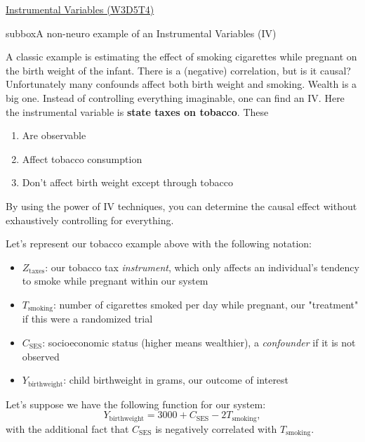 \begin{textbox}{\href{https://compneuro.neuromatch.io/tutorials/W3D5_NetworkCausality/student/W3D5_Tutorial4.html}{Instrumental Variables (W3D5T4)}   }
\begin{subbox}{subbox}{A non-neuro example of an Instrumental Variables (IV)}
\scriptsize

A classic example is estimating the effect of smoking cigarettes while pregnant on the birth weight of the infant. There is a (negative) correlation, but is it causal? Unfortunately many confounds affect both birth weight and smoking. Wealth is a big one. Instead of controlling everything imaginable, one can find an IV. Here the instrumental variable is \textbf{state taxes on tobacco}. These

\begin{enumerate}
    \item    Are observable
    \item   Affect tobacco consumption
    \item   Don't affect birth weight except through tobacco
\end{enumerate}

By using the power of IV techniques, you can determine the causal effect without exhaustively controlling for everything.

Let's represent our tobacco example above with the following notation:
\begin{itemize}
    \item 
 $Z_{\text{taxes}}$: our tobacco tax \textit{instrument}, which only affects an individual's tendency to smoke while pregnant within our system
\item $T_{\text{smoking}}$: number of cigarettes smoked per day while pregnant, our "treatment" if this were a randomized trial
\item $C_{\text{SES}}$: socioeconomic status (higher means wealthier), a \textit{confounder} if it is not observed
\item
$Y_{\text{birthweight}}$: child birthweight in grams, our outcome of interest
\end{itemize}

Let's suppose we have the following function for our system:
$$Y_{\text{birthweight}} = 3000 + C_{\text{SES}} - 2T_{\text{smoking}},$$
with the additional fact that $C_{\text{SES}}$ is negatively correlated with $T_{\text{smoking}}$. 


\end{subbox}
\end{textbox}
